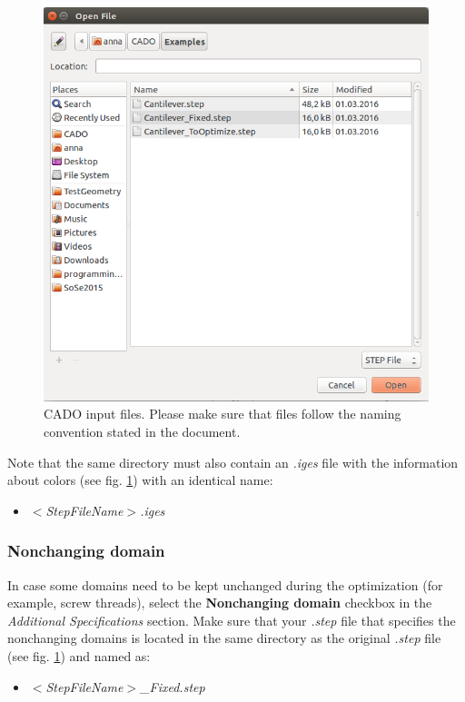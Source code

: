\documentclass[
12pt, %
a4paper, %
oneside, %
headinclude,footinclude, %
BCOR5mm, %
]{scrartcl}
\begin{document}
\begin{figure}
\centering
\includegraphics[scale=0.4]{Pictures/chooseFileDialog.png}
\caption{CADO input files. Please make sure that files follow the naming convention stated in the document.}
\label{fig:fileDialog}
\end{figure} 

Note that the same directory must also contain an \textit{.iges} file with the information about colors (see fig. \ref{fig:fileDialog}) with an identical name:
\begin{itemize}
\item[] \textit{$<$StepFileName$>$.iges}
\end{itemize}

\subsubsection{Nonchanging domain}
In case some domains need to be kept unchanged during the optimization (for example, screw threads), select the \textbf{Nonchanging domain} checkbox in the \textit{Additional Specifications} section. Make sure that your \textit{.step} file that specifies the nonchanging domains is located in the same directory as the original \textit{.step} file (see fig. \ref{fig:fileDialog}) and named as:
\begin{itemize}
\item[] \textit{$<$StepFileName$>${\_}Fixed.step}
\end{itemize}
\end{document}
